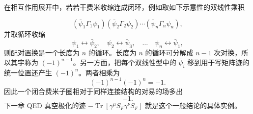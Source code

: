 \begin{derivation}
在相互作用展开中，若若干费米收缩连成闭环，例如取如下示意性的双线性乘积

\begin{equation*}
 (\bar\psi_1\Gamma_1\psi_1)
 (\bar\psi_2\Gamma_2\psi_2)\cdots
 (\bar\psi_n\Gamma_n\psi_n),
\end{equation*}
并取循环收缩
\begin{equation*}
 \psi_1\leftrightarrow\bar\psi_2,
 \quad
 \psi_2\leftrightarrow\bar\psi_3,
 \quad\ldots\quad
 \psi_n\leftrightarrow\bar\psi_1,
\end{equation*}
则配对置换是一个长度为 $n$ 的循环。长度为 $n$ 的循环可分解成 $n-1$ 次对换，所以其宇称为 $(-1)^{n-1}$。另一方面，把每个双线性型中的 $\bar\psi_i$ 移到用于写矩阵迹的统一位置还产生 $(-1)^n$。两者相乘为
\begin{equation*}
 (-1)^{n-1}(-1)^n=-1.
\end{equation*}
因此一个闭合费米子圈相对于同样连接结构的对易的场多出
\begin{equation*}
 {-1.}
 \end{equation*}
下一章 QED 真空极化的迹
$-\operatorname{Tr}[\gamma^\mu S_F\gamma^\nu S_F]$
就是这个一般结论的具体实例。
\end{derivation}

